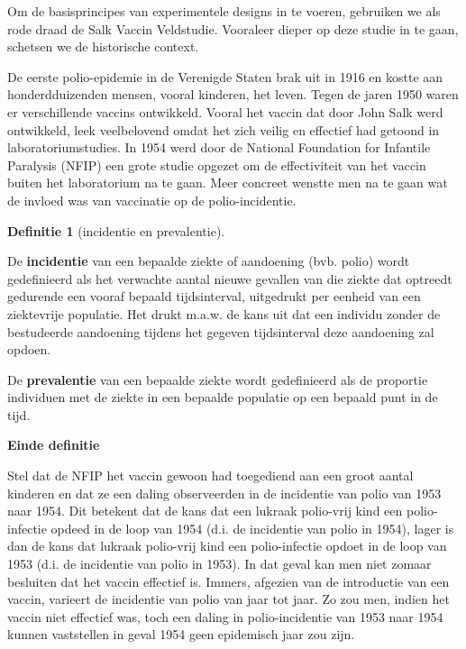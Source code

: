 \documentclass[
  12pt,dutch,coursenotes]{book}
\theoremstyle{definition}
\newtheorem{definition}{Definitie}[chapter]
\theoremstyle{definition}
\theoremstyle{definition}
\theoremstyle{remark}
\begin{document}
Om de basisprincipes van experimentele designs in te voeren, gebruiken we als rode draad de Salk Vaccin Veldstudie. Vooraleer dieper op deze studie in te gaan, schetsen we de historische context.

De eerste polio-epidemie in de Verenigde Staten brak uit in 1916 en kostte
aan honderdduizenden mensen, vooral kinderen, het leven. Tegen de jaren 1950
waren er verschillende vaccins ontwikkeld. Vooral het vaccin dat door John
Salk werd ontwikkeld, leek veelbelovend omdat het zich veilig en effectief
had getoond in laboratoriumstudies. In 1954 werd door de National Foundation
for Infantile Paralysis (NFIP) een grote studie opgezet om de effectiviteit
van het vaccin buiten het laboratorium na te gaan. Meer concreet wenstte men
na te gaan wat de invloed was van vaccinatie op de polio-incidentie.

\begin{definition}[incidentie en prevalentie]
\protect\hypertarget{def:unnamed-chunk-65}{}{\label{def:unnamed-chunk-65} \iffalse (incidentie en prevalentie) \fi{} }
\end{definition}
De \textbf{incidentie} van een bepaalde ziekte of aandoening (bvb. polio)
wordt gedefinieerd als het verwachte aantal nieuwe gevallen van die ziekte
dat optreedt gedurende een vooraf bepaald tijdsinterval, uitgedrukt per
eenheid van een ziektevrije populatie. Het drukt m.a.w. de kans uit dat een
individu zonder de bestudeerde aandoening tijdens het gegeven tijdsinterval
deze aandoening zal opdoen.

De \textbf{prevalentie} van een bepaalde ziekte wordt gedefinieerd als de
proportie individuen met de ziekte in een bepaalde populatie op een bepaald
punt in de tijd.

\textbf{Einde definitie}

Stel dat de NFIP het vaccin gewoon had toegediend aan een groot aantal
kinderen en dat ze een daling observeerden in de incidentie van polio van
1953 naar 1954. Dit betekent dat de kans dat een lukraak polio-vrij kind een
polio-infectie opdeed in de loop van 1954 (d.i. de incidentie van polio in
1954), lager is dan de kans dat lukraak polio-vrij kind een polio-infectie
opdoet in de loop van 1953 (d.i. de incidentie van polio in 1953). In dat
geval kan men niet zomaar besluiten dat het vaccin effectief is. Immers,
afgezien van de introductie van een vaccin, varieert de incidentie van polio
van jaar tot jaar. Zo zou men, indien het vaccin niet effectief was, toch
een daling in polio-incidentie van 1953 naar 1954 kunnen vaststellen in
geval 1954 geen epidemisch jaar zou zijn.
\end{document}
